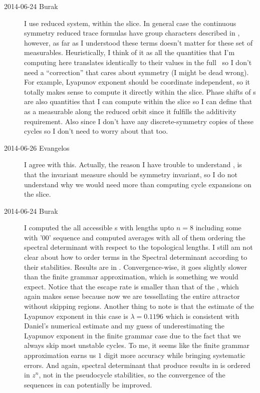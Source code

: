 \begin{description}
\item[2014-06-24 Burak] I use reduced system, within the slice. In general case
the continuous symmetry reduced trace formulas have group characters described
in , however, as far as I understood these terms doesn't 
matter for these set of measurables. Heuristically, I think of it as all the 
quantities that I'm computing here translates identically to their values in
the full \statesp\ so I don't need a ``correction'' that cares about symmetry
(I might be dead wrong). For example, Lyapunov exponent should be coordinate 
independent, so it totally makes sense to compute it directly within the slice. 
Phase shifts of \rpo s are also quantities that I can compute within the slice 
so I can define that as a measurable along the reduced orbit since it fulfills 
the additivity requirement. Also since I don't have any discrete-symmetry copies
of these cycles so I don't need to worry about that too.

\item[2014-06-26 Evangelos] I agree with this. Actually, the reason I have trouble
to understand , is that the invariant measure should be symmetry invariant,
so I do not understand why we would need more than computing cycle expansions on the
slice. 





\item[2014-06-24 Burak] I computed the all accessible \rpo s with lengths upto
$n=8$ including some with '00' sequence and computed averages with all of them
ordering the spectral determinant with respect to the topological lengths. 
I still am not clear about how to order terms in the Spectral determinant 
according to their stabilities. Results are in 
. Convergence-wise, it goes slightly
slower than the finite grammar approximation, which is something we would expect. 
Notice that the escape rate is smaller than that of the 
, which again makes sense because now we are
tessellating the entire attractor without skipping regions. Another thing to
note is that the estimate of the Lyapunov exponent in this case is 
$\lambda = 0.1196$ which is consistent with Daniel's numerical estimate and my
guess of underestimating the Lyapunov exponent in the finite grammar case due 
to the fact that we always skip most unstable cycles. To me, it seems like the
finite grammar approximation earns us $1$ digit more accuracy while bringing 
systematic errors. And again, spectral determinant that produce results in 
 is ordered in $z^n$, not in the 
pseudocycle stabilities, so the convergence of the sequences in
 can potentially be improved.


\end{description}
